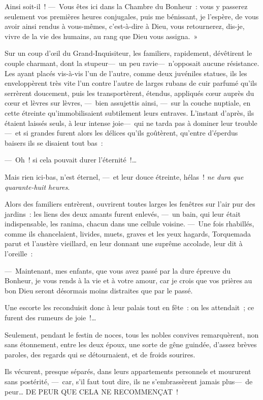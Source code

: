 \documentclass[french,twoside]{book} %
\begin{document}
Ainsi soit-il ! — Vous êtes ici dans la Chambre du Bonheur : vous y passerez seulement vos premières heures conjugales, puis me bénissant, je l’espère, de vous avoir ainsi rendus à vous-mêmes, c’est-à-dire à Dieu, vous retournerez, dis-je, vivre de la vie des humains, au rang que Dieu vous assigna. »\par
Sur un coup d’œil du Grand-Inquisiteur, les familiers, rapidement, dévêtirent le couple charmant, dont la stupeur— un peu ravie— n’opposait aucune résistance. Les ayant placés vis-à-vis l’un de l’autre, comme deux juvéniles statues, ils les enveloppèrent très vite l’un contre l’autre de larges rubans de cuir parfumé qu’ils serrèrent doucement, puis les transportèrent, étendus, appliqués cœur auprès du cœur et lèvres sur lèvres, — bien assujettis ainsi, — sur la couche nuptiale, en cette étreinte qu’immobilisaient subtilement leurs entraves. L’instant d’après, ils étaient laissés seuls, à leur   intense joie— qui ne tarda pas à dominer leur trouble— et si grandes furent alors les délices qu’ils goûtèrent, qu’entre d’éperdus baisers ils se disaient tout bas :\par
— Oh ! si cela pouvait durer l’éternité !…\par
Mais rien ici-bas, n’est éternel, — et leur douce étreinte, hélas ! \emph{ne dura que quarante-huit heures}.\par
Alors des familiers entrèrent, ouvrirent toutes larges les fenêtres sur l’air pur des jardins : les liens des deux amants furent enlevés, — un bain, qui leur était indispensable, les ranima, chacun dans une cellule voisine. — Une fois rhabillés, comme ils chancelaient, livides, muets, graves et les yeux hagards, Torquemada parut et l’austère vieillard, en leur donnant une suprême accolade, leur dit à l’oreille :\par
— Maintenant, mes enfants, que vous avez passé par la dure épreuve du Bonheur, je vous rends à la vie et à votre amour, car je crois que vos prières au bon Dieu seront désormais moins distraites que par le passé.\par
   Une escorte les reconduisit donc à leur palais tout en fête : on les attendait ; ce furent des rumeurs de joie !…\par
Seulement, pendant le festin de noces, tous les nobles convives remarquèrent, non sans étonnement, entre les deux époux, une sorte de gêne guindée, d’assez brèves paroles, des regards qui se détournaient, et de froids sourires.\par
Ils vécurent, presque séparés, dans leurs appartements personnels et moururent sans postérité, — car, s’il faut tout dire, ils ne s’embrassèrent jamais plus— de peur… DE PEUR QUE CELA NE RECOMMENÇAT !
\end{document}
